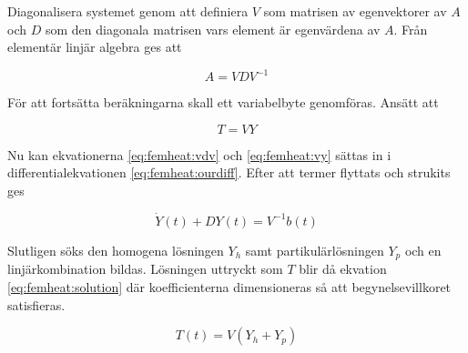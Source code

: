 \noindent
Diagonalisera systemet genom att definiera $V$ som matrisen av egenvektorer av $A$ och $D$ som den
diagonala matrisen vars element är egenvärdena av $A$. Från elementär linjär algebra\cite{lay06} ges att

\begin{equation}
\label{eq:femheat:vdv}
A = VDV^{-1}
\end{equation}

\noindent
För att fortsätta beräkningarna skall ett variabelbyte genomföras. Ansätt att

\begin{equation}
\label{eq:femheat:vy}
T = VY
\end{equation}

\noindent
Nu kan ekvationerna \eqref{eq:femheat:vdv} och \eqref{eq:femheat:vy} sättas in i differentialekvationen
\eqref{eq:femheat:ourdiff}. Efter att termer flyttats och strukits ges

\begin{equation}
\dot{Y}(t) + DY(t) = V^{-1}b(t)
\end{equation}

\noindent
Slutligen söks den homogena lösningen $Y_h$ samt partikulärlösningen $Y_p$ och en linjärkombination bildas.
Lösningen uttryckt som $T$ blir då ekvation \eqref{eq:femheat:solution} där koefficienterna dimensioneras så att
begynelsevillkoret satisfieras.

\begin{equation}
\label{eq:femheat:solution}
T(t) = V(Y_h+Y_p)
\end{equation}
